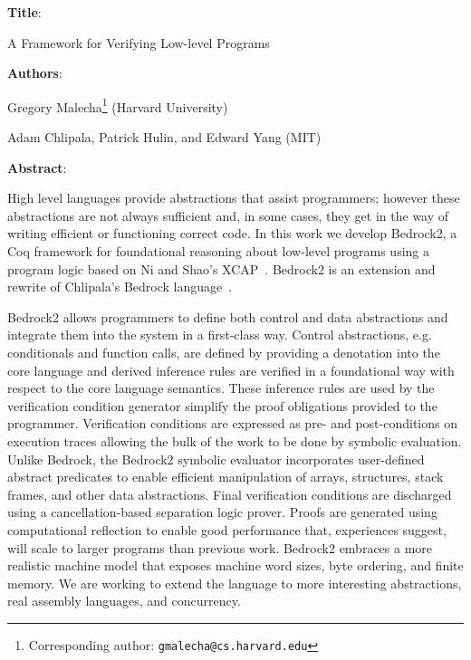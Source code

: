 \documentclass{article}
\begin{document}
\noindent \textbf{Title}:

\noindent A Framework for Verifying Low-level Programs
\vspace{1em}

\noindent \textbf{Authors}:

\noindent Gregory Malecha\footnote{Corresponding author: \texttt{gmalecha@cs.harvard.edu}} (Harvard University) 

\noindent Adam Chlipala, Patrick Hulin, and Edward Yang (MIT)

\vspace{1em} 

\noindent \textbf{Abstract}:

High level languages provide abstractions that assist programmers; however these abstractions are not always sufficient and, in some cases, they get in the way of writing efficient or functioning correct code. In this work we develop Bedrock2, a Coq framework for foundational reasoning about low-level programs using a program logic based on Ni and Shao's XCAP~\cite{ni2007xcap}. Bedrock2 is an extension and rewrite of Chlipala's Bedrock language~\cite{chlipala2011bedrock}.

Bedrock2 allows programmers to define both control and data abstractions and integrate them into the system in a first-class way. Control abstractions, e.g. conditionals and function calls, are defined by providing a denotation into the core language and derived inference rules are verified in a foundational way with respect to the core language semantics. These inference rules are used by the verification condition generator simplify the proof obligations provided to the programmer. Verification conditions are expressed as pre- and post-conditions on execution traces allowing the bulk of the work to be done by symbolic evaluation. Unlike Bedrock, the Bedrock2 symbolic evaluator incorporates user-defined abstract predicates to enable efficient manipulation of arrays, structures, stack frames, and other data abstractions. Final verification conditions are discharged using a cancellation-based separation logic prover. Proofs are generated using computational reflection to enable good performance that, experiences suggest, will scale to larger programs than previous work. Bedrock2 embraces a more realistic machine model that exposes machine word sizes, byte ordering, and finite memory. We are working to extend the language to more interesting abstractions, real assembly languages, and concurrency.



\end{document}
